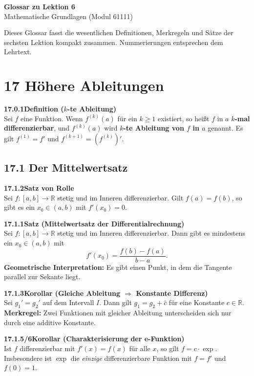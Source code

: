 \documentclass[a4paper,12pt]{article}
\newcommand{\gentry}[3]{%
  \noindent\textbf{#1\quad #2}\nopagebreak\\[0.2em]
  #3\par\smallskip
}
\begin{document}
\begin{center}
  {\LARGE\bfseries Glossar zu Lektion 6}\\[0.5em]
  {\large Mathematische Grundlagen (Modul 61111)}
\end{center}

\vspace{1em}

Dieses Glossar fasst die wesentlichen Definitionen, Merkregeln und Sätze der
sechsten Lektion kompakt zusammen. Nummerierungen entsprechen dem Lehrtext.

\section*{17 \quad Höhere Ableitungen}

\gentry{17.0.1}{Definition ($k$-te Ableitung)}{%
  Sei $f$ eine Funktion. Wenn $f^{(k)}(a)$ für ein $k \ge 1$ existiert, so
  heißt $f$ in $a$ \textbf{$k$-mal differenzierbar}, und $f^{(k)}(a)$ wird
  \textbf{$k$-te Ableitung von $f$ in $a$} genannt. Es gilt $f^{(1)} = f'$
  und $f^{(k+1)} = (f^{(k)})'$.
}

\subsection*{17.1 \quad Der Mittelwertsatz}

\gentry{17.1.2}{Satz von Rolle}{%
  Sei $f:[a,b]\to\mathbb{R}$ stetig und im Inneren differenzierbar. Gilt
  $f(a) = f(b)$, so gibt es ein $x_0 \in (a,b)$ mit $f'(x_0) = 0$.
}

\gentry{17.1.1}{Satz (Mittelwertsatz der Differentialrechnung)}{%
  Sei $f:[a,b]\to\mathbb{R}$ stetig und im Inneren differenzierbar. Dann gibt
  es mindestens ein $x_0 \in (a,b)$ mit
  \[
    f'(x_0) = \frac{f(b)-f(a)}{b-a}.
  \]
  \textbf{Geometrische Interpretation:} Es gibt einen Punkt, in dem die Tangente
  parallel zur Sekante liegt.
}

\gentry{17.1.3}{Korollar (Gleiche Ableitung $\Rightarrow$ Konstante Differenz)}{%
  Sei $g_1' = g_2'$ auf dem Intervall $I$. Dann gilt $g_1 = g_2 + \hat{c}$
  für eine Konstante $c\in\mathbb{R}$.
  \textbf{Merkregel:} Zwei Funktionen mit gleicher Ableitung unterscheiden sich
  nur durch eine additive Konstante.
}

\gentry{17.1.5/6}{Korollar (Charakterisierung der e-Funktion)}{%
  Ist $f$ differenzierbar mit $f'(x) = f(x)$ für alle $x$, so gilt $f = c\cdot\exp$.
  Insbesondere ist $\exp$ die \emph{einzige} differenzierbare Funktion mit
  $f = f'$ und $f(0) = 1$.
}
\end{document}

